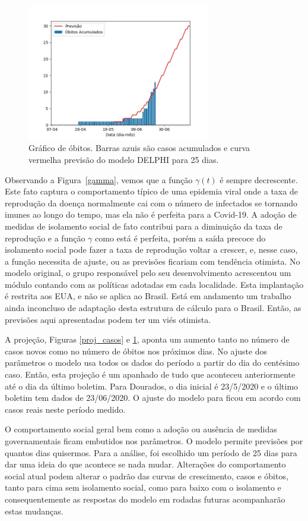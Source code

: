 \documentclass[12pt]{article}
\begin{document}
\begin{figure}[t]
 \centering
 \includegraphics[width=8cm]{figs/Fig_Brasil_MS_Dourados_obitos_20200624_025dias.jpg}
 \caption{Gráfico de óbitos. Barras azuis são casos acumulados e curva vermelha previsão do modelo DELPHI para 25 dias.}
 \label{proj_obitos}
\end{figure}

Observando a Figura~\ref{gamma}, vemos que a função $\gamma(t)$ é sempre decrescente. Este fato captura o comportamento típico de uma epidemia viral onde a taxa de reprodução da doença normalmente cai com o número de infectados se tornando imunes ao longo do tempo, mas ela não é perfeita para a Covid-19. A adoção de medidas de isolamento social de fato contribui para a diminuição da taxa de reprodução e a função $\gamma$ como está é perfeita, porém a saída precoce do isolamento social pode fazer a taxa de reprodução voltar a crescer, e, nesse caso, a função necessita de ajuste, ou as previsões ficariam com tendência otimista. No modelo original, o grupo responsável pelo seu desenvolvimento acrescentou um módulo contando com as políticas adotadas em cada localidade. Esta implantação é restrita aos EUA, e não se aplica ao Brasil. Está em andamento um trabalho ainda inconcluso de adaptação desta estrutura de cálculo para o Brasil. Então, as previsões aqui apresentadas podem ter um viés otimista. 


A projeção, Figuras \ref{proj_casos} e \ref{proj_obitos}, aponta um aumento tanto no número de casos novos como no número de óbitos nos próximos dias. No ajuste dos parâmetros o modelo usa todos os dados do período a partir do dia do centésimo caso. Então, esta projeção é um apanhado de tudo que aconteceu anteriormente até o dia da último boletim. Para Dourados, o dia inicial é 23/5/2020 e o último boletim tem dados de 23/06/2020. O ajuste do modelo para ficou em acordo com casos reais neste período medido.

O comportamento social geral bem como a adoção ou ausência de medidas governamentais ficam embutidos nos parâmetros. O modelo permite previsões por quantos dias quisermos. Para a análise, foi escolhido um período de 25 dias para dar uma ideia do que acontece se nada mudar. Alterações do comportamento social atual podem alterar o padrão das curvas de crescimento, casos e óbitos, tanto para cima sem isolamento social, como para baixo com o isolamento  e consequentemente as respostas do modelo em rodadas futuras acompanharão estas mudanças.
\end{document}
